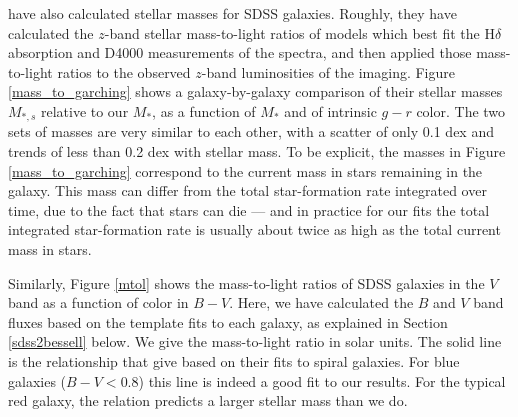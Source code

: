\documentclass[10pt,preprint]{aastex}
\begin{document}
\citet{kauffmann03a} have also calculated stellar masses for SDSS
galaxies. Roughly, they have calculated the $z$-band stellar
mass-to-light ratios of models which best fit the H$\delta$ absorption
and D4000 measurements of the spectra, and then applied those
mass-to-light ratios to the observed $z$-band luminosities of the
imaging. Figure \ref{mass_to_garching} shows a galaxy-by-galaxy
comparison of their stellar masses $M_{\ast,s}$ relative to our
$M_\ast$, as a function of $M_\ast$ and of intrinsic $g-r$ color. The
two sets of masses are very similar to each other, with a scatter of
only 0.1 dex and trends of less than 0.2 dex with stellar mass.  To be
explicit, the masses in Figure \ref{mass_to_garching} correspond to
the current mass in stars remaining in the galaxy. This mass can
differ from the total star-formation rate integrated over time, due to
the fact that stars can die --- and in practice for our fits the total
integrated star-formation rate is usually about twice as high as the
total current mass in stars.

Similarly, Figure \ref{mtol} shows the mass-to-light ratios of SDSS
galaxies in the $V$ band as a function of color in $B-V$. Here, we
have calculated the $B$ and $V$ band fluxes based on the template fits
to each galaxy, as explained in Section \ref{sdss2bessell} below. We
give the mass-to-light ratio in solar units. The solid line is the
relationship that \citet{bell01b} give based on their fits to spiral
galaxies. For blue galaxies ($B-V < 0.8$) this line is indeed a good
fit to our results. For the typical red galaxy, the \citet{bell01b}
relation predicts a larger stellar mass than we do. 
\end{document}
